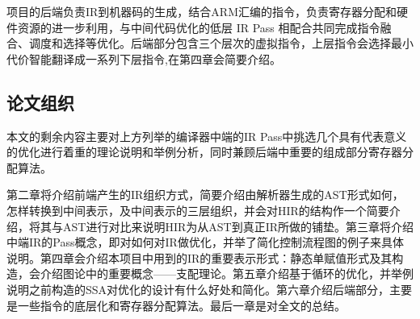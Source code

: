 项目的后端负责IR到机器码的生成，结合ARM汇编的指令，负责寄存器分配和硬件资源的进一步利用，与中间代码优化的低层 IR Pass 相配合共同完成指令融合、调度和选择等优化。后端部分包含三个层次的虚拟指令，上层指令会选择最小代价智能翻译成一系列下层指令,在第四章会简要介绍。



\subsection{论文组织}

本文的剩余内容主要对上方列举的编译器中端的IR Pass中挑选几个具有代表意义的优化进行着重的理论说明和举例分析，同时兼顾后端中重要的组成部分寄存器分配算法。

第二章将介绍前端产生的IR组织方式，简要介绍由解析器生成的AST形式如何，怎样转换到中间表示，及中间表示的三层组织，并会对HIR的结构作一个简要介绍，将其与AST进行对比来说明HIR为从AST到真正IR所做的铺垫。第三章将介绍中端IR的Pass概念，即对如何对IR做优化，并举了简化控制流程图的例子来具体说明。第四章会介绍本项目中用到的IR的重要表示形式：静态单赋值形式及其构造，会介绍图论中的重要概念——支配理论。第五章介绍基于循环的优化，并举例说明之前构造的SSA对优化的设计有什么好处和简化。第六章介绍后端部分，主要是一些指令的底层化和寄存器分配算法。最后一章是对全文的总结。